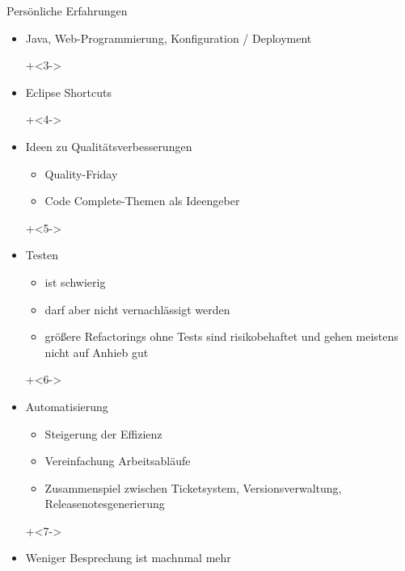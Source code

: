 \begin{frame}{Persönliche Erfahrungen}
 
\begin{itemize}
\onslide+<2->
\item Java, Web-Programmierung, Konfiguration / Deployment
 
\onslide+<3->
\item Eclipse Shortcuts
 
\onslide+<4->
\item Ideen zu Qualitätsverbesserungen
\begin{itemize}
\item Quality-Friday
\item \glqq Code Complete\grqq{}-Themen als Ideengeber
\end{itemize}
 
\onslide+<5->
\item Testen
\begin{itemize}
\item  ist schwierig
\item darf aber nicht vernachlässigt werden
\item größere Refactorings ohne Tests sind risikobehaftet und gehen meistens nicht auf Anhieb gut
\end{itemize}
 
\onslide+<6->
\item Automatisierung
\begin{itemize}
\item Steigerung der Effizienz
\item Vereinfachung Arbeitsabläufe
\item Zusammenspiel zwischen Ticketsystem, Versionsverwaltung, Releasenotesgenerierung
\end{itemize}
 
\onslide+<7->
\item Weniger Besprechung ist machnmal mehr
 
 
\end{itemize}
 
\end{frame}
 
